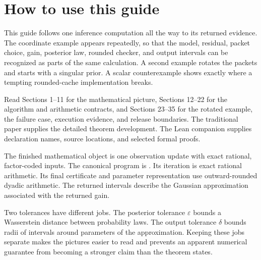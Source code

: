 \documentclass[11pt]{article}
\newcommand{\nextpage}{\clearpage}
\begin{document}
\KomorebiCover
{}


\section*{How to use this guide}
This guide follows one inference computation all the way to its returned evidence. The coordinate example appears repeatedly, so that the model, residual, packet choice, gain, posterior law, rounded checker, and output intervals can be recognized as parts of the same calculation. A second example rotates the packets and starts with a singular prior. A scalar counterexample shows exactly where a tempting rounded-cache implementation breaks.

Read Sections 1--11 for the mathematical picture, Sections 12--22 for the algorithm and arithmetic contracts, and Sections 23--35 for the rotated example, the failure case, execution evidence, and release boundaries. The traditional paper supplies the detailed theorem development. The Lean companion supplies declaration names, source locations, and selected formal proofs.

The finished mathematical object is one observation update with exact rational, factor-coded inputs. The canonical program is . Its iteration is exact rational arithmetic. Its final certificate and parameter representation use outward-rounded dyadic arithmetic. The returned intervals describe the Gaussian approximation associated with the returned gain.

Two tolerances have different jobs. The posterior tolerance $\varepsilon$ bounds a Wasserstein distance between probability laws. The output tolerance $\delta$ bounds radii of intervals around parameters of the approximation. Keeping these jobs separate makes the pictures easier to read and prevents an apparent numerical guarantee from becoming a stronger claim than the theorem states.

\begingroup
\small
\setlength{\parskip}{0pt}
\tableofcontents
\endgroup
\nextpage
\end{document}
